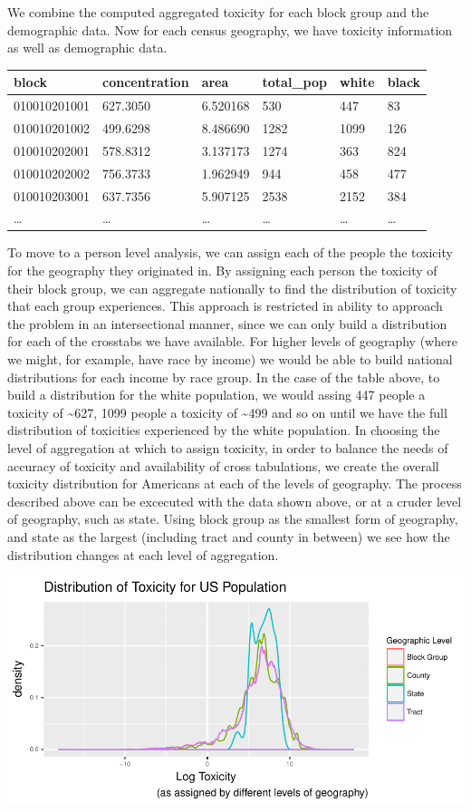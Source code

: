 \documentclass[12pt,twoside]{dukestatscithesis}
\theoremstyle{definition}
\theoremstyle{definition}
\theoremstyle{definition}
\theoremstyle{remark}
\begin{document}
We combine the computed aggregated toxicity for each block group and the
demographic data. Now for each census geography, we have toxicity
information as well as demographic data.
\begin{longtable}[]{@{}llllll@{}}
\toprule
block & concentration & area & total\_pop & white & black\tabularnewline
\midrule
\endhead
010010201001 & 627.3050 & 6.520168 & 530 & 447 & 83\tabularnewline
010010201002 & 499.6298 & 8.486690 & 1282 & 1099 & 126\tabularnewline
010010202001 & 578.8312 & 3.137173 & 1274 & 363 & 824\tabularnewline
010010202002 & 756.3733 & 1.962949 & 944 & 458 & 477\tabularnewline
010010203001 & 637.7356 & 5.907125 & 2538 & 2152 & 384\tabularnewline
\ldots{} & \ldots{} & \ldots{} & \ldots{} & \ldots{} &
\ldots{}\tabularnewline
\bottomrule
\end{longtable}
To move to a person level analysis, we can assign each of the people the
toxicity for the geography they originated in. By assigning each person
the toxicity of their block group, we can aggregate nationally to find
the distribution of toxicity that each group experiences. This approach
is restricted in ability to approach the problem in an intersectional
manner, since we can only build a distribution for each of the crosstabs
we have available. For higher levels of geography (where we might, for
example, have race by income) we would be able to build national
distributions for each income by race group. In the case of the table
above, to build a distribution for the white population, we would assing
447 people a toxicity of \textasciitilde{}627, 1099 people a toxicity of
\textasciitilde{}499 and so on until we have the full distribution of
toxicities experienced by the white population. In choosing the level of
aggregation at which to assign toxicity, in order to balance the needs
of accuracy of toxicity and availability of cross tabulations, we create
the overall toxicity distribution for Americans at each of the levels of
geography. The process described above can be excecuted with the data
shown above, or at a cruder level of geography, such as state. Using
block group as the smallest form of geography, and state as the largest
(including tract and county in between) we see how the distribution
changes at each level of aggregation.

\includegraphics{thesis_files/figure-latex/unnamed-chunk-2-1.pdf}
\end{document}
